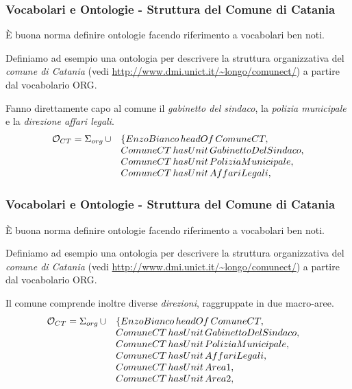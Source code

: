 \documentclass[8pt]{beamer}
\begin{document}
\begin{frame}
\frametitle{Vocabolari e Ontologie - Struttura del Comune di Catania}
\`E buona norma definire ontologie facendo riferimento a vocabolari
ben noti.
\vspace{\baselineskip}

Definiamo ad esempio una ontologia per descrivere la struttura
organizzativa del \emph{comune di Catania} (vedi \url{http://www.dmi.unict.it/~longo/comunect/})
a partire dal vocabolario ORG.
\vspace{\baselineskip}

Fanno direttamente capo al comune il \emph{gabinetto del sindaco}, la \emph{polizia municipale}
e la \emph{direzione affari legali}.
\[
\begin{array}{rl}
\mathcal{O}_{CT} = \Sigma_{org}\,\cup & \{ EnzoBianco\,headOf\,ComuneCT, \\
& ComuneCT\,hasUnit\,GabinettoDelSindaco,\\
& ComuneCT\,hasUnit\,PoliziaMunicipale,\\
& ComuneCT\,hasUnit\,AffariLegali,
\end{array} 
\]
\end{frame}

\begin{frame}
\frametitle{Vocabolari e Ontologie - Struttura del Comune di Catania}
\`E buona norma definire ontologie facendo riferimento a vocabolari
ben noti.
\vspace{\baselineskip}

Definiamo ad esempio una ontologia per descrivere la struttura
organizzativa del \emph{comune di Catania} (vedi \url{http://www.dmi.unict.it/~longo/comunect/})
a partire dal vocabolario ORG.
\vspace{\baselineskip}

Il comune comprende inoltre diverse \emph{direzioni}, raggruppate in due macro-aree. 
\[
\begin{array}{rll}
\mathcal{O}_{CT} = \Sigma_{org}\,\cup & \{ EnzoBianco\,headOf\,ComuneCT, & \\
& ComuneCT\,hasUnit\,GabinettoDelSindaco, & \\
& ComuneCT\,hasUnit\,PoliziaMunicipale, & \\
& ComuneCT\,hasUnit\,AffariLegali, & \\
& ComuneCT\,hasUnit\,Area1, & \\
& ComuneCT\,hasUnit\,Area2, & \\
\end{array} 
\]
\end{frame}
\end{document}
